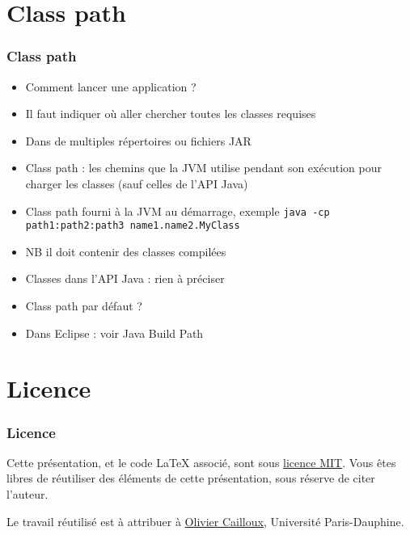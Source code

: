 \documentclass[english, french]{beamer}
\begin{document}
\section{Class path}
\begin{frame}
	\frametitle{Class path}
	\begin{itemize}
		\item Comment lancer une application ?
		\item Il faut indiquer où aller chercher toutes les classes requises
		\item Dans de multiples répertoires ou fichiers JAR
		\item Class path : les chemins que la JVM utilise pendant son exécution pour charger les classes {\tiny (sauf celles de l’API Java)}
		\item Class path fourni à la JVM au démarrage, exemple \texttt{java -cp path1:path2:path3 name1.name2.MyClass}
		\item NB il doit contenir des classes compilées
		\item Classes dans l’API Java : rien à préciser
		\item Class path par défaut ? \onslide<2->{"\texttt{.}"}
		\item Dans Eclipse : voir Java Build Path
	\end{itemize}
\end{frame}

\appendix

\section{Licence}
\begin{frame}
	\frametitle{Licence}
	Cette présentation, et le code LaTeX associé, sont sous \href{https://opensource.org/licenses/MIT}{licence MIT}. Vous êtes libres de réutiliser des éléments de cette présentation, sous réserve de citer l’auteur.
	
	Le travail réutilisé est à attribuer à \href{http://www.lamsade.dauphine.fr/~ocailloux/}{Olivier Cailloux}, Université Paris-Dauphine.
\end{frame}
\end{document}
